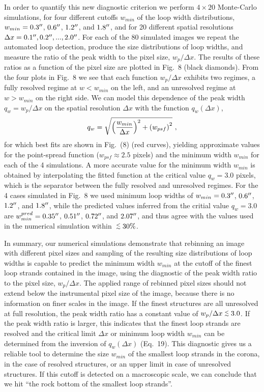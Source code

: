 \documentclass[10pt,preprint]{aastex}  %
\def\arcsec{\hbox{$^{\prime\prime}$}}
\def\lapprox{\lower.4ex\hbox{$\;\buildrel <\over{\scriptstyle\sim}\;$}}
\begin{document}
In order to quantify this new diagnostic criterion we perform $4 \times 20$
Monte-Carlo simulations, for four different cutoffs $w_{min}$
of the loop width distributions, $w_{min}=0.3\arcsec$, 
$0.6\arcsec$, $1.2\arcsec$, and $1.8\arcsec$, and for 20
different spatial resolutions $\Delta x=0.1\arcsec,
0.2\arcsec, ..., 2.0\arcsec$. For each of the 80 simulated
images we repeat the automated loop detection, produce
the size distributions of loop widths, and measure the ratio
of the peak width to the pixel size, $w_p/\Delta x$. The
results of these ratios as a function of the pixel size
are plotted in Fig.~8 (black diamonds).
From the four plots in Fig.~8 we see that each function
$w_p/\Delta x$ exhibits two regimes, a fully resolved
regime at $w < w_{min}$ on the left, and an unresolved regime
at $w > w_{min}$ on the right side. We can model this dependence of
the peak width $q_w=w_p/\Delta x$ on the spatial resolution $\Delta x$
with the function $q_w(\Delta x)$,
\begin{equation}
	q_w = \sqrt{ \left({w_{min} \over \Delta x} \right)^2 
		+ \left( w_{psf} \right)^2 } \ ,
\end{equation}
for which best fits are shown in Fig.~(8) (red curves), yielding
approximate values for the point-spread function ($w_{psf} \approx 2.5$ 
pixels) and the minimum width $w_{min}$ for each of the 4 simulations.
A more accurate value for the minimum width $w_{min}$ is obtained
by interpolating the fitted function at the critical value
$q_w=3.0$ pixels, which is the separator between the fully resolved
and unresolved regimes. For the 4 cases simulated in Fig.~8 we used
minimum loop widths of $w_{min}=0.3\arcsec$, $0.6\arcsec$, $1.2\arcsec$, 
and $1.8\arcsec$, while the predicted values inferred from the critial
value $q_w=3.0$ are $w_{min}^{pred}=0.35\arcsec$, $0.51\arcsec$, 
$0.72\arcsec$, and $2.07\arcsec$, and thus agree with the values 
used in the numerical simulation within $\lapprox 30\%$.  

In summary, our numerical simulations demonstrate that 
rebinning an image with different pixel sizes and sampling of the resulting
size distributions of loop widths is capable to predict the
minimum width $w_{min}$ at the cutoff of the finest loop strands
contained in the image, using the diagnostic of the peak width 
ratio to the pixel size, $w_p/\Delta x$.  The applied
range of rebinned pixel sizes should not extend below the
instrumental pixel size of the image, because there is no 
information on finer scales in the image. If the finest structures
are all unresolved at full resolution, the peak width
ratio has a constant value of $w_p/\Delta x \lapprox 3.0$.
If the peak width ratio is larger, this indicates that the finest 
loop strands are resolved and the critical limit $\Delta x$ or 
minimum loop width $w_{min}$ can be determined from the inversion of
$q_w (\Delta x)$ (Eq.~19). This diagnostic 
gives us a reliable tool to determine the size $w_{min}$ of the
smallest loop strands in the corona, in the case of resolved structures, 
or an upper limit in case of unresolved structures.
If this cutoff is detected on a macroscopic scale, we can conclude 
that we hit ``the rock bottom of the smallest loop strands''.  
\end{document}
